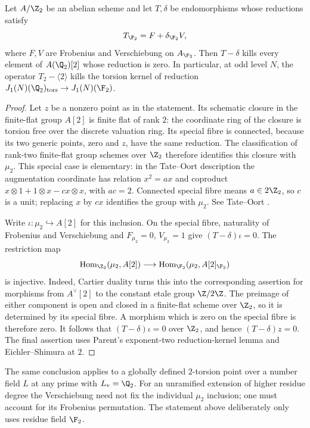 \begin{lemma}\label{lem:dyadic-Hecke}
Let $A/\Z_2$ be an abelian scheme and let $T,\delta$ be
endomorphisms whose reductions satisfy
\[
 T_{\F_2}=F+\delta_{\F_2}V,
\]
where $F,V$ are Frobenius and Verschiebung on $A_{\F_2}$.
Then $T-\delta$ kills every element of $A(\Q_2)[2]$ whose
reduction is zero.
In particular, at odd level $N$, the operator
$T_2-\langle2\rangle$ kills the torsion kernel of reduction
$J_1(N)(\Q_2)_{\rm tors}\to J_1(N)(\F_2)$.
\end{lemma}
\begin{proof}
Let $z$ be a nonzero point as in the statement. Its schematic
closure in the finite-flat group $A[2]$ is finite flat of rank
$2$: the coordinate ring of the closure is torsion free over
the discrete valuation ring. Its special fibre is connected,
because its two generic points, zero and $z$, have the same
reduction. The classification of rank-two finite-flat group
schemes over $\Z_2$ therefore identifies this closure with
$\mu_2$. This special case is elementary: in the Tate--Oort
description the augmentation coordinate has relation $x^2=ax$
and coproduct $x\otimes1+1\otimes x-cx\otimes x$, with
$ac=2$. Connected special fibre means $a\in2\Z_2$, so $c$
is a unit; replacing $x$ by $cx$ identifies the group with
$\mu_2$. See Tate--Oort \cite{TO}.

Write $\iota:\mu_2\hookrightarrow A[2]$ for this inclusion.
On the special fibre, naturality of Frobenius and Verschiebung
and $F_{\mu_2}=0$, $V_{\mu_2}=1$ give
$(T-\delta)\iota=0$.
The restriction map
\[
 \operatorname{Hom}_{\Z_2}(\mu_2,A[2])\longrightarrow
 \operatorname{Hom}_{\F_2}(\mu_2,A[2]_{\F_2})
\]
is injective. Indeed, Cartier duality turns this into the
corresponding assertion for morphisms from $A^\vee[2]$ to
the constant etale group $\Z/2\Z$. The preimage of either
component is open and closed in a finite-flat scheme over
$\Z_2$, so it is determined by its special fibre. A morphism
which is zero on the special fibre is therefore zero.
It follows that $(T-\delta)\iota=0$ over $\Z_2$, and hence
$(T-\delta)z=0$.
The final assertion uses Parent's exponent-two reduction-kernel
lemma and Eichler--Shimura at $2$.
\end{proof}

The same conclusion applies to a globally defined $2$-torsion
point over a number field $L$ at any prime with $L_v=\Q_2$.
For an unramified extension of higher residue degree the
Verschiebung need not fix the individual $\mu_2$ inclusion;
one must account for its Frobenius permutation. The statement
above deliberately only uses residue field $\F_2$.


